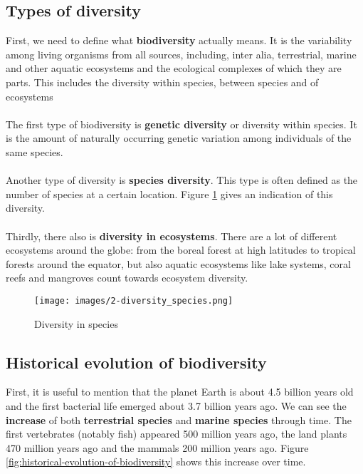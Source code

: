 \documentclass[../summary.tex]{subfiles}
\begin{document}
	\subsection{Types of diversity}
	First, we need to define what \textbf{biodiversity} actually means. It is the variability among living organisms from all sources, including, inter alia, terrestrial, marine and other aquatic ecosystems and the ecological complexes of which they are parts. This includes the diversity within species, between species and of ecosystems
	\\
	\\
	The first type of biodiversity is \textbf{genetic diversity} or diversity within species. It is the amount of naturally occurring genetic variation among individuals of the same species. 
	\\
	\\
	Another type of diversity is \textbf{species diversity}. This type is often defined as the number of species at a certain location. Figure \ref{fig:diversity_species} gives an indication of this diversity.
	\\
	\\
	Thirdly, there also is \textbf{diversity in ecosystems}. There are a lot of different ecosystems around the globe: from the boreal forest at high latitudes to tropical forests around the equator, but also aquatic ecosystems like lake systems, coral reefs and mangroves count towards ecosystem diversity.
	\\
	\begin{figure}[H]
		\centering
		\texttt{[image: images/2-diversity\_species.png]}
		\caption{Diversity in species}
		\label{fig:diversity_species}
	\end{figure}
	
	\subsection{Historical evolution of biodiversity}

	First, it is useful to mention that the planet Earth is about 4.5 billion years old and the first bacterial life emerged about 3.7 billion years ago. We can see the \textbf{increase} of both \textbf{terrestrial species} and \textbf{marine species} through time. The first vertebrates (notably fish) appeared 500 million years ago, the land plants 470 million years ago and the mammals 200 million years ago. Figure \ref{fig:historical-evolution-of-biodiversity} shows this increase over time.
	
\end{document}
